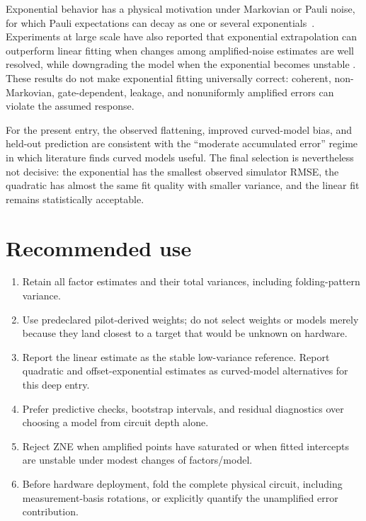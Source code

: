 \documentclass[11pt]{article}
\begin{document}
Exponential behavior has a physical motivation under Markovian or Pauli
noise, for which Pauli expectations can decay as one or several
exponentials~\cite{cai2021,krebsbach2022}.  Experiments at large scale have
also reported that exponential extrapolation can outperform linear fitting
when changes among amplified-noise estimates are well resolved, while
downgrading the model when the exponential becomes unstable
\cite{kim2023utility}.  These results do not make exponential fitting
universally correct: coherent, non-Markovian, gate-dependent, leakage, and
nonuniformly amplified errors can violate the assumed response.

For the present entry, the observed flattening, improved curved-model bias,
and held-out prediction are consistent with the ``moderate accumulated
error'' regime in which literature finds curved models useful.  The final
selection is nevertheless not decisive: the exponential has the smallest
observed simulator RMSE, the quadratic has almost the same fit quality with
smaller variance, and the linear fit remains statistically acceptable.

\section{Recommended use}

\begin{enumerate}
  \item Retain all factor estimates and their total variances, including
        folding-pattern variance.
  \item Use predeclared pilot-derived weights; do not select weights or models
        merely because they land closest to a target that would be unknown on
        hardware.
  \item Report the linear estimate as the stable low-variance reference.
        Report quadratic and offset-exponential estimates as curved-model
        alternatives for this deep entry.
  \item Prefer predictive checks, bootstrap intervals, and residual
        diagnostics over choosing a model from circuit depth alone.
  \item Reject ZNE when amplified points have saturated or when fitted
        intercepts are unstable under modest changes of factors/model.
  \item Before hardware deployment, fold the complete physical circuit,
        including measurement-basis rotations, or explicitly quantify the
        unamplified error contribution.
\end{enumerate}
\end{document}
